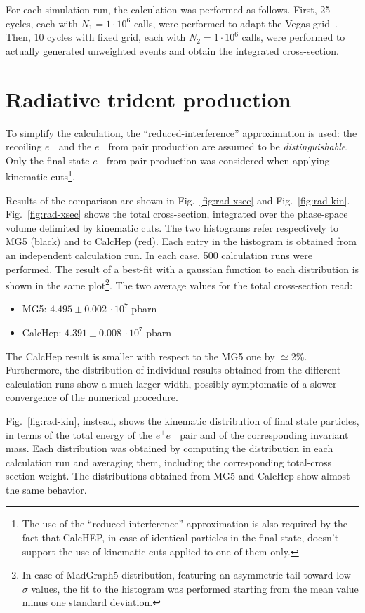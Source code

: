 \documentclass{article}
\begin{document}
For each simulation run, the calculation was performed as follows. First, 25 cycles, each with $N_1=1\cdot 10^6$ calls, were performed to adapt the Vegas grid~\cite{vegas}. Then, 10 cycles with fixed grid, each with $N_2=1\cdot10^6$ calls, were performed to actually generated unweighted events and obtain the integrated cross-section.

\section{Radiative trident production}
To simplify the calculation, the ``reduced-interference'' approximation is used: the recoiling $e^-$ and the $e^-$ from pair production are assumed to be \textit{distinguishable}. Only the final state $e^-$ from pair production was considered when applying kinematic cuts\footnote{The use of the ``reduced-interference'' approximation is also required by the fact that CalcHEP, in case of identical particles in the final state, doesn't support the use of kinematic cuts applied to one of them only.}. 

Results of the comparison are shown in Fig.~\ref{fig:rad-xsec} and Fig.~\ref{fig:rad-kin}. Fig.~\ref{fig:rad-xsec} shows the total cross-section, integrated over the phase-space volume delimited by kinematic cuts. The two histograms refer respectively to MG5 (black) and to CalcHep (red). Each entry in the histogram is obtained from an independent calculation run. In each case, 500 calculation runs were performed. The result of a best-fit with a gaussian function to each distribution is shown in the same plot\footnote{In case of MadGraph5 distribution, featuring an asymmetric tail toward low $\sigma$ values, the fit to the histogram was performed starting from the mean value minus one standard deviation.}. The two average values for the total cross-section read:
\begin{itemize}
\item MG5: $4.495\pm0.002 \, \cdot 10^7$ pbarn
\item CalcHep: $4.391\pm0.008 \, \cdot 10^7$ pbarn
\end{itemize}
The CalcHep result is smaller with respect to the MG5 one by $\simeq 2\%$. Furthermore, the distribution of individual results obtained from the different calculation runs show a much larger width, possibly symptomatic of a slower convergence of the numerical procedure.

Fig.~\ref{fig:rad-kin}, instead, shows the kinematic distribution of final state particles, in terms of the total energy of the $e^+ e^-$ pair and of the corresponding invariant mass. Each distribution was obtained by computing the distribution in each calculation run and averaging them, including the corresponding total-cross section weight. The distributions obtained from MG5 and CalcHep show almost the same behavior.
\end{document}
